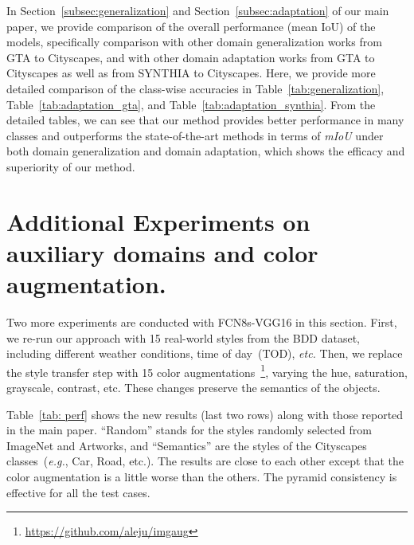 \documentclass[10pt,twocolumn,letterpaper]{article}
\begin{document}
In Section~\ref{subsec:generalization} and Section~\ref{subsec:adaptation} of our main paper, we provide comparison of the overall performance (mean IoU) of the models, specifically comparison with other domain generalization works from GTA to Cityscapes, and with other domain adaptation works from GTA to Cityscapes as well as from SYNTHIA to Cityscapes. 
Here, we provide more detailed comparison of the class-wise accuracies in Table~\ref{tab:generalization}, Table~\ref{tab:adaptation_gta}, and Table~\ref{tab:adaptation_synthia}. From the detailed tables, we can see that our method provides better performance in many classes and outperforms the state-of-the-art methods in terms of \textit{mIoU} under both domain generalization and domain adaptation, which shows the efficacy and superiority of our method.

\section{Additional Experiments on auxiliary domains and color augmentation. }

Two more experiments are conducted with FCN8s-VGG16 in this section. First, we re-run our approach with 15 real-world styles from the BDD dataset, including different weather conditions, time of day~(TOD), \textit{etc.} Then, we replace the style transfer step with 15 color augmentations~\footnote{\url{https://github.com/aleju/imgaug}}, varying the hue, saturation,  grayscale, contrast, etc. These changes preserve the semantics of the objects.

Table~\ref{tab: perf} shows the new results (last two rows) along with those reported in the main paper.  ``Random'' stands for the styles randomly selected from ImageNet and Artworks, and ``Semantics'' are the styles of the Cityscapes classes~(\textit{e.g.}, Car, Road, etc.). The results are close to each other except that the color augmentation is a little worse than the others. The pyramid consistency  is effective for all the test cases.
\end{document}
